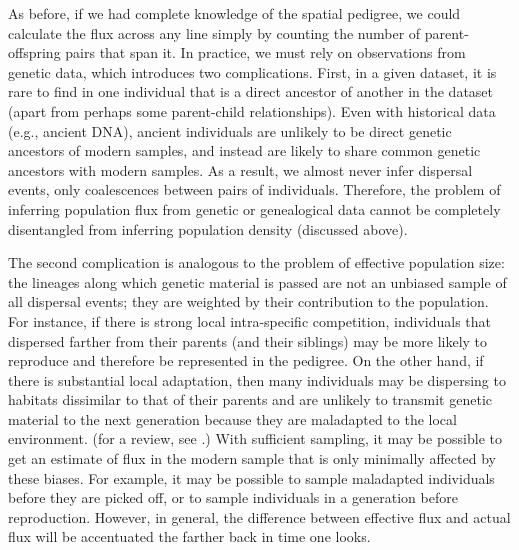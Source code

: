 \documentclass{ar-1col}
\begin{document}
As before, if we had complete knowledge of the spatial pedigree,
we could calculate the flux across any line simply by counting the number of
parent-offspring pairs that span it.
In practice, we must rely on observations from genetic data,
which introduces two complications.
First, in a given dataset, it is rare to find in one individual
that is a direct ancestor of another in the dataset
(apart from perhaps some parent-child relationships).
Even with historical data (e.g., ancient DNA),
ancient individuals are unlikely to be direct genetic ancestors of modern samples,
and instead are likely to share common genetic ancestors with modern samples.
As a result, we almost never infer dispersal events,
only coalescences between pairs of individuals.
Therefore, the problem of inferring population flux from genetic or genealogical data
cannot be completely disentangled from inferring population density (discussed above).

The second complication is analogous to the problem of effective population size:
the lineages along which genetic material is passed are not an unbiased sample of all dispersal events;
they are weighted by their contribution to the population.
For instance, if there is strong local intra-specific competition,
individuals that dispersed farther from their parents (and their siblings)
may be more likely to reproduce and therefore be represented in the pedigree.
On the other hand, if there is substantial local adaptation,
then many individuals may be dispersing to habitats dissimilar to that of their parents
and are unlikely to transmit genetic material to the next generation
because they are maladapted to the local environment.
(for a review, see \cite{bradburdwang}.)
With sufficient sampling,
it may be possible to get an estimate of flux in the modern sample
that is only minimally affected by these biases.
For example, it may be possible to sample maladapted individuals
before they are picked off,
or to sample individuals in a generation before reproduction.
However, in general, the difference between effective flux and actual flux
will be accentuated the farther back in time one looks.

\end{document}
